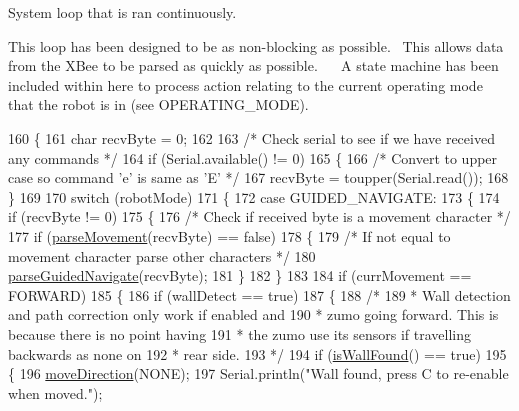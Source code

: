 System loop that is ran continuously. 

This loop has been designed to be as non-\/blocking as possible.~\newline
This allows data from the X\+Bee to be parsed as quickly as possible.~\newline
~\newline
A state machine has been included within here to process action relating to the current operating mode that the robot is in (see O\+P\+E\+R\+A\+T\+I\+N\+G\+\_\+\+M\+O\+D\+E). 
\begin{DoxyCode}
160 \{
161   \textcolor{keywordtype}{char} recvByte = 0;
162 
163   \textcolor{comment}{/* Check serial to see if we have received any commands */}
164   \textcolor{keywordflow}{if} (Serial.available() != 0)
165   \{
166     \textcolor{comment}{/* Convert to upper case so command 'e' is same as 'E' */}
167     recvByte = toupper(Serial.read());
168   \}
169 
170   \textcolor{keywordflow}{switch} (robotMode)
171   \{
172     \textcolor{keywordflow}{case} GUIDED\_NAVIGATE:
173     \{
174       \textcolor{keywordflow}{if} (recvByte != 0)
175       \{
176         \textcolor{comment}{/* Check if received byte is a movement character */}
177         \textcolor{keywordflow}{if} (\hyperlink{robotcode_8ino_adb00c91c925985a922f8c668dd439000}{parseMovement}(recvByte) == \textcolor{keyword}{false})
178         \{
179           \textcolor{comment}{/* If not equal to movement character parse other characters */}
180           \hyperlink{robotcode_8ino_abbe89b02b936909feba8810c9675390f}{parseGuidedNavigate}(recvByte);
181         \}
182       \}
183 
184       \textcolor{keywordflow}{if} (currMovement == FORWARD)
185       \{
186         \textcolor{keywordflow}{if} (wallDetect == \textcolor{keyword}{true})
187         \{
188           \textcolor{comment}{/*}
189 \textcolor{comment}{           * Wall detection and path correction only work if enabled and}
190 \textcolor{comment}{           * zumo going forward. This is because there is no point having}
191 \textcolor{comment}{           * the zumo use its sensors if travelling backwards as none on}
192 \textcolor{comment}{           * rear side.}
193 \textcolor{comment}{           */}
194           \textcolor{keywordflow}{if} (\hyperlink{robotcode_8ino_a2d3a70671b195d39ddeb7a437b85d957}{isWallFound}() == \textcolor{keyword}{true})
195           \{
196             \hyperlink{robotcode_8ino_af776ff77e94170ec456760c6962020e5}{moveDirection}(NONE);
197             Serial.println(\textcolor{stringliteral}{"Wall found, press C to re-enable when moved."});

\end{DoxyCode}
